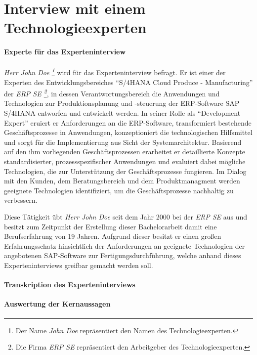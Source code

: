 \section*{Interview mit einem Technologieexperten}

\paragraph{Experte für das Experteninterview}
\textit{Herr John Doe \footnote{Der Name \textit{John Doe} repräsentiert den Namen des Technologieexperten.}} wird für das Experteninterview befragt.
 Er ist einer der Experten des Entwicklungsbereiches \enquote{S/4HANA Cloud Produce - Manufacturing} der \textit{ERP SE \footnote{Die Firma \textit{ERP SE} repräsentiert den Arbeitgeber des Technologieexperten.}}, in dessen Verantwortungsbereich die Anwendungen und Technologien zur Produktionsplanung und -steuerung der ERP-Software SAP S/4HANA entworfen und entwickelt werden.
 In seiner Rolle als \enquote{Development Expert} eruiert er Anforderungen an die ERP-Software, transformiert bestehende Geschäftsprozesse in Anwendungen, konzeptioniert die technologischen Hilfsmittel und sorgt für die Implementierung aus Sicht der Systemarchitektur. Basierend auf den ihm vorliegenden Geschäftsprozessen erarbeitet er detaillierte Konzepte standardisierter, prozessspezifischer Anwendungen und evaluiert dabei mögliche Technologien, die zur Unterstützung der Geschäftsprozesse fungieren. Im Dialog mit den Kunden, dem Beratungsbereich und dem Produktmanagment werden geeignete Technologien identifiziert, um die Geschäftsprozesse nachhaltig zu verbessern. 
 
Diese Tätigkeit übt \textit{Herr John Doe} seit dem Jahr 2000 bei der \textit{ERP SE} aus und besitzt zum Zeitpunkt der Erstellung dieser Bachelorarbeit damit eine Berufserfahrung von 19 Jahren. Aufgrund dieser besitzt er einen großen Erfahrungsschatz hinsichtlich der Anforderungen an geeignete Technologien der angebotenen SAP-Software zur Fertigungsdurchführung, welche anhand dieses Experteninterviews greifbar gemacht werden soll.

\paragraph{Transkription des Experteninterviews}
\paragraph{Auswertung der Kernaussagen}


